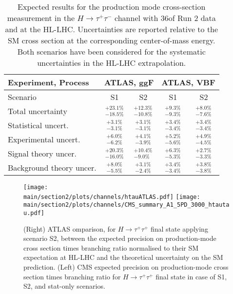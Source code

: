 \begin{table}[th!]
\begin{center}
\renewcommand{\arraystretch}{1.5}
{
\caption{Expected results for the production mode cross-section measurement in the $H\to \tau^{+} \tau^{-}$ channel with 36\fbinv of Run 2 data and at the HL-LHC. Uncertainties are reported relative to the SM cross section at the corresponding center-of-mass energy. Both scenarios have been considered for the systematic uncertainties in the HL-LHC extrapolation.}
\label{tab:htt_proj}
\begin{tabular}{l | c c c c}
\hline\hline
Experiment, Process & \multicolumn{2}{c}{ATLAS, ggF}& \multicolumn{2}{c}{ATLAS, VBF}\\ 
\hline
Scenario &  S1 & S2 & S1 & S2  \\
Total uncertainty   & $^{+23.1\%}_{-18.5\%}$& $^{+12.3\%}_{-10.8\%}$  & $^{+9.3\%}_{-9.3\%}$ & $^{+8.0\%}_{-7.6\%}$ \\
\hline
Statistical uncert.  & $^{+3.1\%}_{-3.1\%}$ & $^{+3.1\%}_{-3.1\%}$  & $^{+3.4\%}_{-3.4\%}$ & $^{+3.4\%}_{-3.4\%}$\\
Experimental uncert. & $^{+6.0\%}_{-6.2\%}$ & $^{+4.1\%}_{-3.9\%}$  & $^{+5.2\%}_{-5.6\%}$ & $^{+4.9\%}_{-4.5\%}$ \\
Signal theory uncer. & $^{+20.3\%}_{-16.0\%}$ & $^{+10.4\%}_{-9.0\%}$ & $^{+6.3\%}_{-5.3\%}$ & $^{+2.7\%}_{-3.3\%}$\\
Background theory uncer. & $^{+8.0\%}_{-5.5\%}$ & $^{+3.1\%}_{-2.4\%}$ & $^{+3.4\%}_{-3.4\%}$ & $^{+3.8\%}_{-3.8\%}$\\
\hline\hline
\end{tabular}
} %
\end{center}
\end{table}

 \begin{figure}[h!]
\begin{center}
\texttt{[image: \\main/section2/plots/channels/htauATLAS.pdf]}
\texttt{[image: \\main/section2/plots/channels/CMS\_summary\_A1\_5PD\_3000\_htautau.pdf]}
\end{center}
\caption{(Right) ATLAS omparison, for $H \to \tau^{+}\tau^{+}$ final state applying scenario S2, between the expected precision on production-mode cross section times branching ratio normalised to their SM expectation at HL-LHC and the theoretical uncertainty on the SM prediction. (Left) CMS expected precision on production-mode cross section times branching ratio for $H \to \tau^{+}\tau^{+}$ final state in case of S1, S2, and stat-only scenarios.
}
\label{fig:htt_proj}
\end{figure}


